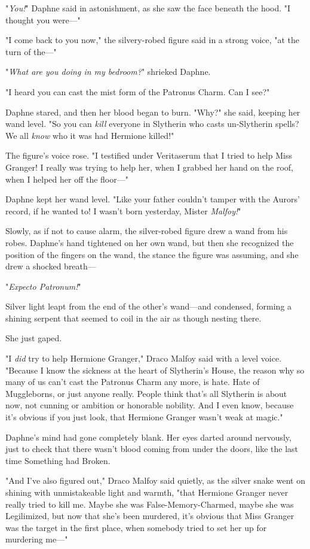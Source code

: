 "\emph{You!}" Daphne said in astonishment, as she saw the face beneath the 
hood. "I thought you were---"

"I come back to you now," the silvery-robed figure said in a strong voice, "at 
the turn of the---"

"\emph{What are you doing in my bedroom?}" shrieked Daphne.

"I heard you can cast the mist form of the Patronus Charm. Can I see?"

Daphne stared, and then her blood began to burn. "Why?" she said, keeping her 
wand level. "So you can \emph{kill} everyone in Slytherin who casts 
un-Slytherin spells? We all \emph{know} who it was had Hermione killed!"

The figure's voice rose. "I testified under Veritaserum that I tried to help 
Miss Granger! I really was trying to help her, when I grabbed her hand on the 
roof, when I helped her off the floor---"

Daphne kept her wand level. "Like your father couldn't tamper with the Aurors' 
record, if he wanted to! I wasn't born yesterday, Mister \emph{Malfoy!}"

Slowly, as if not to cause alarm, the silver-robed figure drew a wand from his 
robes. Daphne's hand tightened on her own wand, but then she recognized the 
position of the fingers on the wand, the stance the figure was assuming, and 
she drew a shocked breath---

"\emph{Expecto Patronum!}"

Silver light leapt from the end of the other's wand---and condensed, forming a 
shining serpent that seemed to coil in the air as though nesting there.

She just gaped.

"I \emph{did} try to help Hermione Granger," Draco Malfoy said with a level 
voice. "Because I know the sickness at the heart of Slytherin's House, the 
reason why so many of us can't cast the Patronus Charm any more, is hate. Hate 
of Muggleborns, or just anyone really. People think that's all Slytherin is 
about now, not cunning or ambition or honorable nobility. And I even know, 
because it's obvious if you just look, that Hermione Granger wasn't weak at 
magic."

Daphne's mind had gone completely blank. Her eyes darted around nervously, just 
to check that there wasn't blood coming from under the doors, like the last 
time Something had Broken.

"And I've also figured out," Draco Malfoy said quietly, as the silver snake 
went on shining with unmistakeable light and warmth, "that Hermione Granger 
never really tried to kill me. Maybe she was False-Memory-Charmed, maybe she 
was Legilimized, but now that she's been murdered, it's obvious that Miss 
Granger was the target in the first place, when somebody tried to set her up 
for murdering me---"

